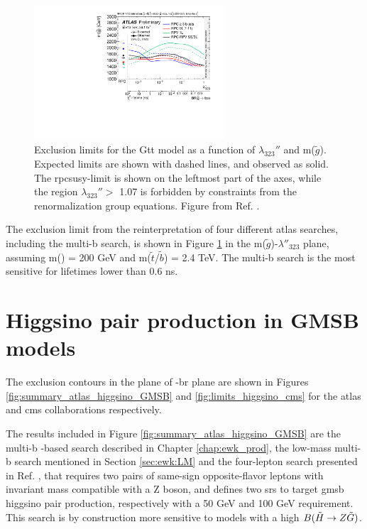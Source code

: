 \begin{figure}[htbp]
	\centering
	\includegraphics[width=0.63\textwidth]{figures/rpv/fig_04.pdf}
	\caption{	
	Exclusion limits for the Gtt model as a function of $\lambda_{323}''$ and m($\tilde{g}$). Expected limits are shown with dashed lines, and observed as solid. The \gls{rpcsusy}-limit is shown on the leftmost part of the axes, while the region $\lambda_{323}''>$ 1.07 is forbidden by constraints from the renormalization group equations. Figure from Ref. \cite{ATLAS-CONF-2018-003}.
	} 
	\label{fig:rpv_Gtt}
\end{figure}

The exclusion limit from the reinterpretation of four different \gls{atlas} searches, including the multi-b search, 
is shown in Figure \ref{fig:rpv_Gtt} in the m($\tilde{g}$)-$\lambda''_{323}$ plane, assuming m(\ninoone) = 200 GeV and  
m($\tilde{t}$/$\tilde{b}$) = 2.4 TeV. 
The multi-b search is the most sensitive for \ninoone lifetimes lower than 0.6 ns. 


\FloatBarrier

\section{Higgsino pair production in GMSB models}

The exclusion contours in the plane of \mhino-\gls{br} plane are shown in Figures \ref{fig:summary_atlas_higgsino_GMSB} 
and \ref{fig:limits_higgsino_cms} for the \gls{atlas} and \gls{cms} collaborations respectively.

The results included in Figure \ref{fig:summary_atlas_higgsino_GMSB} are the multi-b \met-based search described in Chapter \ref{chap:ewk_prod},
the low-mass multi-b search mentioned in Section \ref{sec:ewk:LM} and 
the four-lepton search presented in Ref. \cite{Aaboud:2018zeb}, that requires two pairs of same-sign opposite-flavor leptons 
with invariant mass compatible with a Z boson, and defines two \glspl{sr} to target \gls{gmsb} higgsino pair production, respectively 
with a 50 GeV and 100 GeV \met requirement. This search is by construction more sensitive to models with a high $B(\tilde{H}\rightarrow Z \tilde{G})$.

